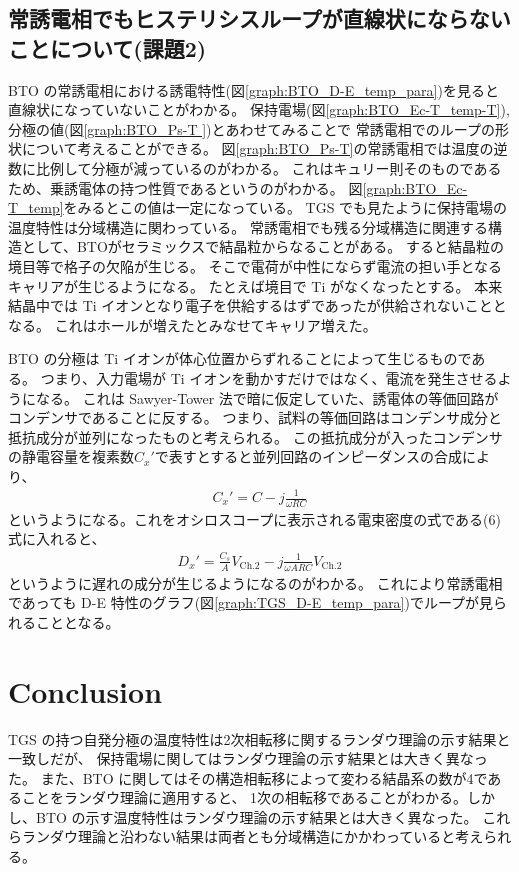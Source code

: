 \documentclass[9pt,dvipdfmx,a4paper]{jsarticle}
\begin{document}
\subsection{常誘電相でもヒステリシスループが直線状にならないことについて(課題2)}
BTO の常誘電相における誘電特性(図\ref{graph:BTO_D-E_temp_para})を見ると直線状になっていないことがわかる。
保持電場(図\ref{graph:BTO_Ec-T_temp-T}), 分極の値(図\ref{graph:BTO_Ps-T })とあわせてみることで
常誘電相でのループの形状について考えることができる。
図\ref{graph:BTO_Ps-T}の常誘電相では温度の逆数に比例して分極が減っているのがわかる。
これはキュリー則そのものであるため、乗誘電体の持つ性質であるというのがわかる。
図\ref{graph:BTO_Ec-T_temp}をみるとこの値は一定になっている。
TGS でも見たように保持電場の温度特性は分域構造に関わっている。
常誘電相でも残る分域構造に関連する構造として、BTOがセラミックスで結晶粒からなることがある。
すると結晶粒の境目等で格子の欠陥が生じる。
そこで電荷が中性にならず電流の担い手となるキャリアが生じるようになる。
たとえば境目で Ti がなくなったとする。
本来結晶中では Ti イオンとなり電子を供給するはずであったが供給されないこととなる。
これはホールが増えたとみなせてキャリア増えた。

BTO の分極は Ti イオンが体心位置からずれることによって生じるものである。
つまり、入力電場が Ti イオンを動かすだけではなく、電流を発生させるようになる。
これは Sawyer-Tower 法で暗に仮定していた、誘電体の等価回路がコンデンサであることに反する。
つまり、試料の等価回路はコンデンサ成分と抵抗成分が並列になったものと考えられる。
この抵抗成分が入ったコンデンサの静電容量を複素数\(C_x'\)で表すとすると並列回路のインピーダンスの合成により、
\begin{align}
    C_x' = C - j\frac{1}{\omega RC}
\end{align}
というようになる。これをオシロスコープに表示される電束密度の式である(6)式に入れると、
\begin{align}
    D_x' = \frac{C_s}{A}V_{\text{Ch.2}} -j \frac{1}{\omega ARC} V_{\text{Ch.2}}
\end{align}
というように遅れの成分が生じるようになるのがわかる。
これにより常誘電相であっても D-E 特性のグラフ(図\ref{graph:TGS_D-E_temp_para})でループが見られることとなる。


\section{Conclusion}
TGS の持つ自発分極の温度特性は2次相転移に関するランダウ理論の示す結果と一致しだが、
保持電場に関してはランダウ理論の示す結果とは大きく異なった。
また、BTO に関してはその構造相転移によって変わる結晶系の数が4であることをランダウ理論に適用すると、
1次の相転移であることがわかる。しかし、BTO の示す温度特性はランダウ理論の示す結果とは大きく異なった。
これらランダウ理論と沿わない結果は両者とも分域構造にかかわっていると考えられる。
\end{document}
